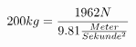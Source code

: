 \documentclass[preview]{standalone}
\begin{document}
\begin{align*}
\special{dvisvgm:raw <g id='unique000'>}200kg = \frac{1962N}{9.81 \frac{Meter}{Sekunde^{2}}}\special{dvisvgm:raw </g>}
\end{align*}
\end{document}
